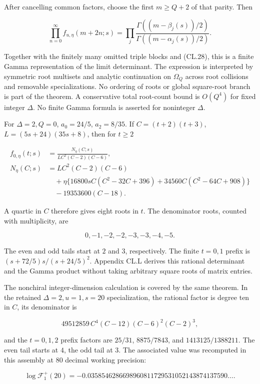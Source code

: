 After cancelling common factors, choose the first \(m\geq Q+2\) of that parity. Then

\[
\prod_{n=0}^{\infty}f_{u,\eta}(m+2n;s)
=\prod_j\frac{\Gamma((m-\beta_j(s))/2)}
{\Gamma((m-\alpha_j(s))/2)}.
\tag{CL.30}
\]

Together with the finitely many omitted triple blocks and (CL.28), this is a finite Gamma representation of the limit determinant. The expression is interpreted by symmetric root multisets and analytic continuation on \(\Omega_Q\) across root collisions and removable specializations. No ordering of roots or global square-root branch is part of the theorem. A conservative total root-count bound is \(O(Q^4)\) for fixed integer \(\Delta\). No finite Gamma formula is asserted for noninteger \(\Delta\).

For \(\Delta=2,Q=0\), \(a_0=24/5\), \(a_2=8/35\). If \(C=(t+2)(t+3)\), \(L=(5s+24)(35s+8)\), then for \(t\geq2\)

\[
\begin{aligned}
f_{0,\eta}(t;s)&=\frac{N_\eta(C;s)}{LC^2(C-2)(C-6)},\\
N_\eta(C;s)&=LC^2(C-2)(C-6)\\
&\quad+\eta\{16800sC(C^2-32C+396)
+34560C(C^2-64C+908)\}\\
&\quad-19353600(C-18).
\end{aligned}
\tag{CL.31}
\]

A quartic in \(C\) therefore gives eight roots in \(t\). The denominator roots, counted with multiplicity, are

\[0,-1,-2,-2,-3,-3,-4,-5.\]

The even and odd tails start at \(2\) and \(3\), respectively. The finite \(t=0,1\) prefix is \((s+72/5)s/(s+24/5)^2\). Appendix CL.L derives this rational determinant and the Gamma product without taking arbitrary square roots of matrix entries.

The nonchiral integer-dimension calculation is covered by the same theorem. In the retained \(\Delta=2,u=1,s=20\) specialization, the rational factor is degree ten in \(C\), its denominator is

\[
49512859\,C^4(C-12)(C-6)^2(C-2)^3,
\]

and the \(t=0,1,2\) prefix factors are \(25/31\), \(8875/7843\), and \(1413125/1388211\). The even tail starts at \(4\), the odd tail at \(3\). The associated value was recomputed in this assembly at 80 decimal working precision:

\[
\log\mathcal F_1^+(20)
=-0.0358546286698960811729531052143874137590\ldots.
\]

